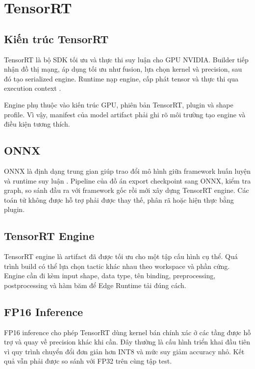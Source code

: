 \section{TensorRT}

\subsection{Kiến trúc TensorRT}

TensorRT là bộ SDK tối ưu và thực thi suy luận cho GPU NVIDIA. Builder tiếp nhận
đồ thị mạng, áp dụng tối ưu như fusion, lựa chọn kernel và precision, sau đó tạo
serialized engine. Runtime nạp engine, cấp phát tensor và thực thi qua execution
context \cite{tensorrt}.

Engine phụ thuộc vào kiến trúc GPU, phiên bản TensorRT, plugin và shape profile.
Vì vậy, manifest của model artifact phải ghi rõ môi trường tạo engine và điều kiện
tương thích.

\subsection{ONNX}

ONNX là định dạng trung gian giúp trao đổi mô hình giữa framework huấn luyện và
runtime suy luận \cite{onnx}. Pipeline của đồ án export checkpoint sang ONNX,
kiểm tra graph, so sánh đầu ra với framework gốc rồi mới xây dựng TensorRT
engine. Các toán tử không được hỗ trợ phải được thay thế, phân rã hoặc hiện thực
bằng plugin.

\subsection{TensorRT Engine}

TensorRT engine là artifact đã được tối ưu cho một tập cấu hình cụ thể. Quá trình
build có thể lựa chọn tactic khác nhau theo workspace và phần cứng. Engine cần
đi kèm input shape, data type, tên binding, preprocessing, postprocessing và hàm
băm để Edge Runtime tải đúng cách.

\subsection{FP16 Inference}

FP16 inference cho phép TensorRT dùng kernel bán chính xác ở các tầng được hỗ
trợ và quay về precision khác khi cần. Đây thường là cấu hình triển khai đầu tiên
vì quy trình chuyển đổi đơn giản hơn INT8 và mức suy giảm accuracy nhỏ. Kết quả
vẫn phải được so sánh với FP32 trên cùng tập test.


